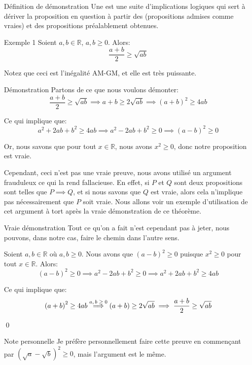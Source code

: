 \documentclass[a4paper]{article}
\begin{document}
\begin{parag}{Définition de démonstration}
    Une  est une suite d'implications logiques qui sert à dériver la proposition en question à partir des  (propositions admises comme vraies) et des propositions préalablement obtenues.
\end{parag}

\begin{parag}{Exemple 1}
    Soient $a, b \in \mathbb{R}$, $a, b \geq 0$. Alors: 
    \[\frac{a + b}{2} \geq \sqrt{ab}\]

    Notez que ceci est l'inégalité AM-GM, et elle est très puissante.
    
    \begin{subparag}{Démonstration}
        Partons de ce que nous voulons démonter: 
        \[\frac{a + b}{2} \geq \sqrt{ab} \implies a + b \geq 2\sqrt{ab} \implies \left(a + b\right)^2 \geq 4ab\]

        Ce qui implique que: 
        \[a^2 + 2ab + b^2 \geq 4ab \implies a^2 - 2ab + b^2 \geq 0 \implies \left(a - b\right)^2 \geq 0\]
        
        
        Or, nous savons que pour tout $x \in \mathbb{R}$, nous avons $x^2 \geq 0$, donc notre proposition est vraie.

        Cependant, ceci n'est pas une vraie preuve, nous avons utilisé un argument frauduleux ce qui la rend fallacieuse. En effet, si $P$ et $Q$ sont deux propositions sont telles que $P \implies Q$, et si nous savons que $Q$ est vraie, alors cela n'implique pas nécessairement que $P$ soit vraie. Nous allons voir un exemple d'utilisation de cet argument à tort après la vraie démonstration de ce théorème.
    \end{subparag}

    \begin{subparag}{Vraie démonstration}
        Tout ce qu'on a fait n'est cependant pas à jeter, nous pouvons, dans notre cas, faire le chemin dans l'autre sens.

        Soient $a, b \in \mathbb{R}$ où $a, b \geq 0$. Nous avons que $\left(a - b\right)^2 \geq 0$ puisque $x^2 \geq 0$ pour tout $x \in \mathbb{R}$. Alors: 
        \[\left(a - b\right)^2 \geq 0 \implies a^2 - 2ab + b^2 \geq 0 \implies a^2 + 2ab + b^2\geq 4ab\]

        Ce qui implique que:
        \[\left(a + b\right)^2 \geq 4ab \over{\implies}{$a, b \geq 0$} \left(a + b\right) \geq 2\sqrt{ab} \implies \frac{a + b}{2} \geq \sqrt{ab}\]

        \qed
    \end{subparag}

    \begin{subparag}{Note personnelle}
        Je préfère personnellement faire cette preuve en commençant par $\left(\sqrt{a} - \sqrt{b}\right)^2 \geq 0$, mais l'argument est le même.
    \end{subparag}
    
    
\end{parag}
\end{document}
